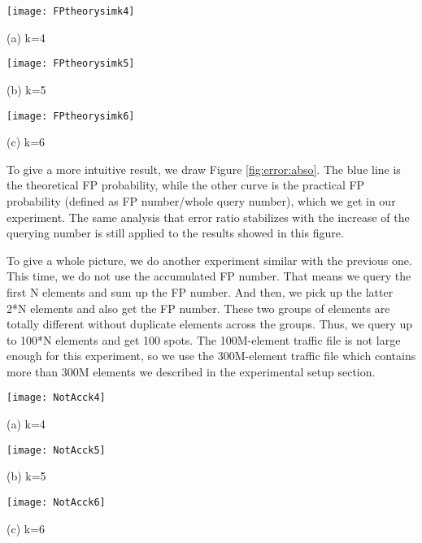  \begin{figure*}[htbp]
 	\begin{minipage}{0.32\linewidth}
 		\centerline{\texttt{[image: FPtheorysimk4]}}
 		\centerline{(a) k=4}
 	\end{minipage}
 	\hfill
 	\begin{minipage}{0.32\linewidth}
 		\centerline{\texttt{[image: FPtheorysimk5]}}
 		\centerline{(b) k=5}
 	\end{minipage}
 	\hfill
 	\begin{minipage}{0.32\linewidth}
 		\centerline{\texttt{[image: FPtheorysimk6]}}
 		\centerline{(c) k=6}
 	\end{minipage}
 	\caption{FP probability error vs. \# of queries with different $k$.}
 	\label{fig:error:abso}
 \end{figure*}

 To give a more intuitive result, we draw Figure \ref{fig:error:abso}. The blue line is the theoretical FP probability, while the other curve is the practical FP probability (defined as FP number/whole query number), which we get in our experiment. The same analysis that error ratio stabilizes with the increase of the querying number is still applied to the results showed in this figure.


 To give a whole picture, we do another experiment similar with the previous one. This time, we do not use the accumulated FP number. That means we query the first N elements and sum up the FP number. And then, we pick up the latter 2*N elements and also get the FP number. These two groups of elements are totally different without duplicate elements across the groups. Thus, we query up to 100*N elements and get 100 spots. The 100M-element traffic file is not large enough for this experiment, so we use the 300M-element traffic file which contains more than 300M elements we described in the experimental setup section.

 \begin{figure*}[htbp]
 	\begin{minipage}{0.32\linewidth}
 		\centerline{\texttt{[image: NotAcck4]}}
 		\centerline{(a) k=4}
 	\end{minipage}
 	\hfill
 	\begin{minipage}{0.32\linewidth}
 		\centerline{\texttt{[image: NotAcck5]}}
 		\centerline{(b) k=5}
 	\end{minipage}
 	\hfill
 	\begin{minipage}{0.32\linewidth}
 		\centerline{\texttt{[image: NotAcck6]}}
 		\centerline{(c) k=6}
 	\end{minipage}
 	\caption{FP probability error vs. \# of queries with independent queries.} \vspace{-0.1in}
 	\label{fig:error:notAcc}
 \end{figure*}

